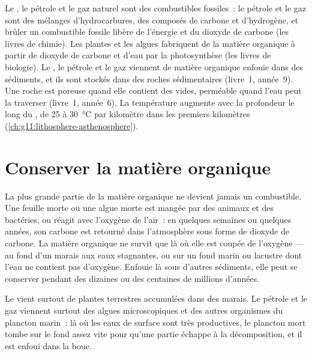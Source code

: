 \begin{recall}
Le , le pétrole et le gaz naturel sont des combustibles fossiles~:
le pétrole et le gaz sont des mélanges d'hydrocarbures, des composés de
carbone et d'hydrogène, et brûler un combustible fossile libère de
l'énergie et du dioxyde de carbone (les livres de chimie). Les plantes et
les algues fabriquent de la matière organique à partir de dioxyde de
carbone et d'eau par la photosynthèse (les livres de biologie). Le ,
le pétrole et le gaz viennent de matière organique enfouie dans des
sédiments, et ils sont stockés dans des roches sédimentaires (livre~1,
année~9). Une roche est poreuse quand elle contient des vides, perméable
quand l'eau peut la traverser (livre~1, année~6). La température augmente
avec la profondeur le long du , de 25 à \qty{30}{\degreeCelsius}
par kilomètre dans les premiers kilomètres
(\cref{ch:g11:lithosphere-asthenosphere}).
\end{recall}

\section{Conserver la matière organique}

La plus grande partie de la matière organique ne devient jamais un
combustible. Une feuille morte ou une algue morte est mangée par des
animaux et des bactéries, ou réagit avec l'oxygène de l'air~: en quelques
semaines ou quelques années, son carbone est retourné dans l'atmosphère
sous forme de dioxyde de carbone. La matière organique ne survit que là où
elle est coupée de l'oxygène --- au fond d'un marais aux eaux stagnantes,
ou sur un fond marin ou lacustre dont l'eau ne contient pas d'oxygène.
Enfouie là sous d'autres sédiments, elle peut se conserver pendant des
dizaines ou des centaines de millions d'années.

Le  vient surtout de plantes terrestres accumulées dans des marais.
Le pétrole et le gaz viennent surtout des algues microscopiques et des
autres organismes du plancton marin~: là où les eaux de surface sont très
productives, le plancton mort tombe sur le fond assez vite pour qu'une
partie échappe à la décomposition, et il est enfoui dans la boue.


